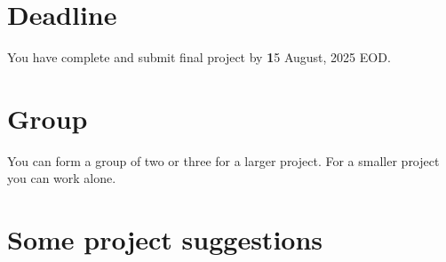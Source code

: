 \documentclass{article}
\begin{document}
\section*{Deadline}
You have complete and submit final project by {\textbf 15 August, 2025} EOD. 

\section*{Group}
You can form a group of two or three for a larger project. For a smaller project you can work alone. 

\newpage

\section*{Some project suggestions}
\end{document}

